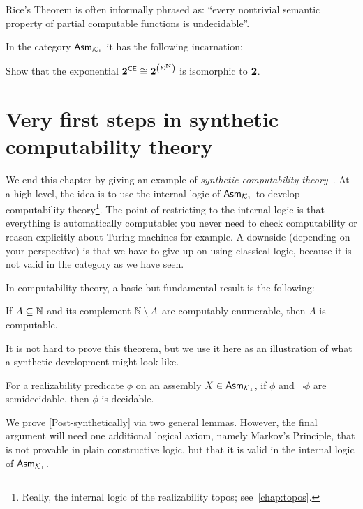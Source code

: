 Rice's Theorem is often informally phrased as: ``every nontrivial semantic
property of partial computable functions is undecidable''.

In the category \(\Asm{\Kone}\) it has the following incarnation:
\begin{exercise}\label{exer:Rice-consequence}
  Show that the exponential \(\Two^\CE \cong \Two^{\pa*{\Sigma^\NatAsm}}\) is isomorphic to \(\Two\).
\end{exercise}

\section{Very first steps in synthetic computability theory}

We end this chapter by giving an example of \emph{synthetic computability
theory}~\cite{Bauer2006}.
%
At a high level, the idea is to use the internal logic of \(\Asm{\Kone}\) to
develop computability theory\footnote{Really, the internal logic of the
  realizability topos; see~\cref{chap:topos}.}.
%
The point of restricting to the internal logic is that everything is
automatically computable: you never need to check computability or reason
explicitly about Turing machines for example.
%
A downside (depending on your perspective) is that we have to give up on using
classical logic, because it is not valid in the category as we have seen.

In computability theory, a basic but fundamental result is the following:

\begin{theorem*}[Post]
  If \(A \subseteq \Nat\) and its complement \(\Nat \setminus A\) are computably
  enumerable, then \(A\) is computable.
\end{theorem*}

It is not hard to prove this theorem, but we use it here as an illustration of
what a synthetic development might look like.

\begin{theorem}\label{Post-synthetically}
  For a realizability predicate \(\phi\) on an assembly \(X \in \Asm{\Kone}\),
  if \(\phi\) and \(\lnot\phi\) are semidecidable, then \(\phi\) is decidable.
\end{theorem}

We prove \cref{Post-synthetically} via two general lemmas.
%
However, the final argument will need one additional logical axiom, namely Markov's
Principle, that is not provable in plain constructive logic, but that it is
valid in the internal logic of \(\Asm{\Kone}\).


